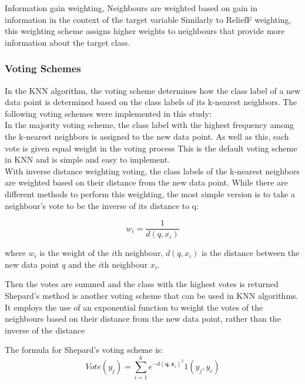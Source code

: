 Information gain weighting, Neighbours are weighted based on gain in information in the context of the target variable\cite{brownlee2019}
Similarly to ReliefF weighting, this weighting scheme assigns higher weights to neighbours that provide more information about the target class.\\

\subsubsection*{Voting Schemes}
In the KNN algorithm, the voting scheme determines how the class label of a new data point is determined based on the class labels of its k-nearest neighbors.
The following voting schemes were implemented in this study:\\

In the majority voting scheme, the class label with the highest frequency among the k-nearest neighbors is assigned to the new data point.
As well as this, each vote is given equal weight in the voting process\cite{uccNotes}
This is the default voting scheme in KNN and is simple and easy to implement.\\

With inverse distance weighting voting, the class labels of the k-nearest neighbors are weighted based on their distance from the new data point.
While there are different methods to perform this weighting, the most simple version is to take a neighbour's vote to be the inverse
of its distance to q:

\[ w_i = \frac{1}{d(q, x_i)} \]

where \(w_i\) is the weight of the \(i\)th neighbour, \(d(q, x_i)\) is the distance between the new data point \(q\) and the \(i\)th neighbour \(x_i\).

Then the votes are summed and the class with the highest votes is returned\cite{uccNotes}\\

Shepard's method is another voting scheme that can be used in KNN algorithms. 
It employs the use of an exponential function to weight the votes of the neighbours based on their distance from the new data point,
rather than the inverse of the distance\cite{Cunningham2021}

The formula for Shepard's voting scheme is:
\begin{equation} 
    Vote(y_j)=\sum_{i=1}^k e^{-d(\mathbf{q,x}_i)^2}1(y_j,y_c)
\end{equation}

